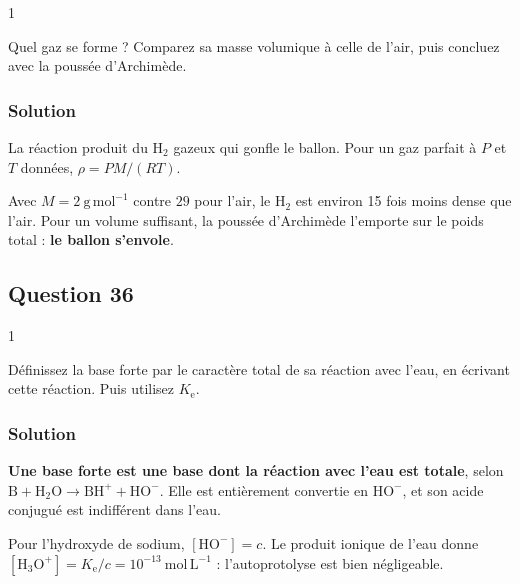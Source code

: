\documentclass[11pt,a4paper]{article}
\newcommand{\equationajustee}[1]{%
  \sbox{\boiteequation}{$\displaystyle #1$}%
  \ifdim\wd\boiteequation>\linewidth
    \[\resizebox{\linewidth}{!}{\usebox{\boiteequation}}\]%
  \else
    \[#1\]%
  \fi}
\begin{document}
\begin{indication}{1}

Quel gaz se forme ? Comparez sa masse volumique à celle de l'air, puis concluez avec la poussée d'Archimède.

\end{indication}

\hypertarget{solution-34}{%
\subsubsection{Solution}\label{solution-34}}

La réaction produit du \(\mathrm H_2\) gazeux qui gonfle le ballon. Pour un gaz parfait à \(P\) et \(T\) données, \(\rho=PM/(RT)\).

Avec \(M=2\ \mathrm{g\,mol^{-1}}\) contre \(29\) pour l'air, le \(\mathrm H_2\) est environ 15 fois moins dense que l'air. Pour un volume suffisant, la poussée d'Archimède l'emporte sur le poids total : \textbf{le ballon s'envole}.

\hypertarget{question-36}{%
\subsection{Question 36}\label{question-36}}

\begin{indication}{1}

Définissez la base forte par le caractère total de sa réaction avec l'eau, en écrivant cette réaction. Puis utilisez \(K_{\mathrm e}\).

\end{indication}

\hypertarget{solution-35}{%
\subsubsection{Solution}\label{solution-35}}

\textbf{Une base forte est une base dont la réaction avec l'eau est totale}, selon \(\mathrm B+\mathrm H_2\mathrm O\to\mathrm{BH^+}+\mathrm{HO^-}\). Elle est entièrement convertie en \(\mathrm{HO^-}\), et son acide conjugué est indifférent dans l'eau.

Pour l'hydroxyde de sodium, \([\mathrm{HO^-}]=c\). Le produit ionique de l'eau donne \([\mathrm{H_3O^+}]=K_{\mathrm e}/c=10^{-13}\ \mathrm{mol\,L^{-1}}\) : l'autoprotolyse est bien négligeable.

\equationajustee{\mathrm{pH}=\mathrm pK_{\mathrm e}+\log c}
\end{document}
